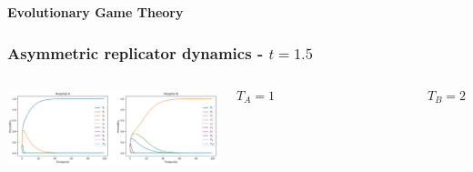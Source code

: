 


\begin{frame}
    \huge
    \centering

    \textbf{Evolutionary Game Theory}
    

\end{frame}

\begin{frame}
    \frametitle{Asymmetric replicator dynamics - \(t = 1.5\)}
    \begin{columns}
        \centering
        \column{\dimexpr\paperwidth-10pt}
        \includegraphics[width=\textwidth]{Bin/replicator_dynamics/ard_t_1.5.png}

        \[T_A = 1  \qquad \qquad \qquad \qquad \qquad \qquad T_B = 2\]
    \end{columns}

\end{frame}


